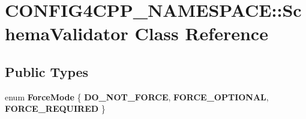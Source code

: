 \hypertarget{classCONFIG4CPP__NAMESPACE_1_1SchemaValidator}{\section{C\-O\-N\-F\-I\-G4\-C\-P\-P\-\_\-\-N\-A\-M\-E\-S\-P\-A\-C\-E\-:\-:Schema\-Validator Class Reference}
\label{classCONFIG4CPP__NAMESPACE_1_1SchemaValidator}
}
\subsection*{Public Types}
\begin{DoxyCompactItemize}
\item 
enum {\bfseries Force\-Mode} \{ {\bfseries D\-O\-\_\-\-N\-O\-T\-\_\-\-F\-O\-R\-C\-E}, 
{\bfseries F\-O\-R\-C\-E\-\_\-\-O\-P\-T\-I\-O\-N\-A\-L}, 
{\bfseries F\-O\-R\-C\-E\-\_\-\-R\-E\-Q\-U\-I\-R\-E\-D}
 \}
\end{DoxyCompactItemize}

